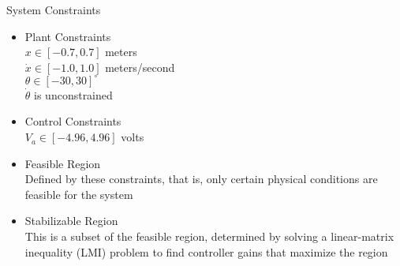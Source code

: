 \documentclass{beamer}
\begin{document}
\begin{frame}{System Constraints}

\begin{itemize}
\pause \item Plant Constraints\\
\pause $x\in\left[-0.7,0.7\right]$ meters\\
\pause $\dot{x}\in\left[-1.0,1.0\right]$ meters/second\\
\pause $\theta\in\left[-30,30\right]^{\circ}$\\
\pause $\dot{\theta}$ is unconstrained
\pause \item Control Constraints\\
\pause $V_a\in\left[-4.96,4.96\right]$ volts
\pause \item Feasible Region\\
Defined by these constraints, that is, only certain physical conditions are feasible for the system
\pause \item Stabilizable Region\\
This is a subset of the feasible region, determined by solving a linear-matrix inequality (LMI) problem to find controller gains that maximize the region\\

\end{itemize}

\end{frame}
\end{document}
